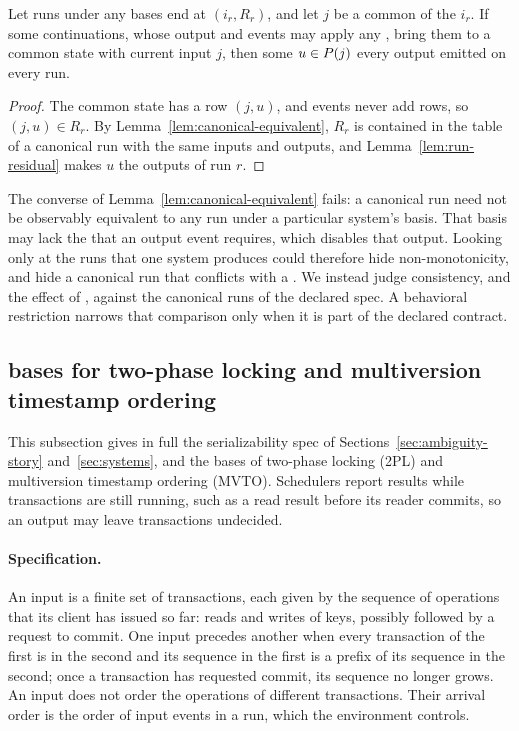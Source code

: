 \begin{corollary}
\label{cor:reconciliation-any-basis}
Let runs under any \commitment bases end at $(i_r,R_r)$, and let $j$ be a
common \indesc of the $i_r$.  If some continuations, whose output and \commitment events
may apply any \commitments, bring them to a common state with current input $j$,
then some $u\in P(j)$ \outrel every output emitted on every run.
\end{corollary}

\begin{proof}
The common state has a row $(j,u)$, and events never add rows, so
$(j,u)\in R_r$.  By Lemma~\ref{lem:canonical-equivalent}, $R_r$ is contained in
the table of a canonical run with the same inputs and outputs, and
Lemma~\ref{lem:run-residual} makes $u$ \outrel the outputs of run $r$.
\end{proof}

The converse of Lemma~\ref{lem:canonical-equivalent} fails: a canonical run
need not be observably equivalent to any run under a particular system's
basis.  That basis may lack the \commitment that an output event requires,
which disables that output.  Looking only at the runs that one system produces
could therefore hide non-monotonicity, and hide a canonical run that conflicts
with a \commitment.  We instead judge consistency, and the effect of
\commitments, against the canonical runs of the declared spec.  A behavioral
restriction narrows that comparison only when it is part of the declared
contract.

\subsection{\Commitment bases for two-phase locking and multiversion timestamp ordering}
\label{app:cc-bases}

This subsection gives in full the serializability spec of
Sections~\ref{sec:ambiguity-story} and~\ref{sec:systems}, and the \commitment
bases of two-phase locking (2PL) and multiversion timestamp ordering (MVTO).
Schedulers report results while transactions are still running, such as a
read result before its reader commits, so an output may leave transactions
undecided.

\paragraph{Specification.}
An input is a finite set of transactions, each given by the sequence of
operations that its client has issued so far: reads and writes of keys,
possibly followed by a request to commit.  One input precedes another when
every transaction of the first is in the second and its sequence in the first
is a prefix of its sequence in the second; once a transaction has requested
commit, its sequence no longer grows.  An input does not order the operations
of different transactions.  Their arrival order is the order of input events
in a run, which the environment controls.

